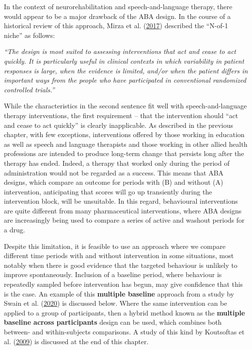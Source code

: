 \documentclass{krantz}
\begin{document}
In the context of neurorehabilitation and speech-and-language therapy, there would appear to be a major drawback of the ABA design. In the course of a historical review of this approach, Mirza et al. (\protect\hyperlink{ref-mirza2017}{2017}) described the ``N-of-1 niche'' as follows:

\emph{``The design is most suited to assessing interventions that act and cease to act quickly. It is particularly useful in clinical contexts in which variability in patient responses is large, when the evidence is limited, and/or when the patient differs in important ways from the people who have participated in conventional randomized controlled trials.''}

While the characteristics in the second sentence fit well with speech-and-language therapy interventions, the first requirement -- that the intervention should ``act and cease to act quickly'' is clearly inapplicable. As described in the previous chapter, with few exceptions, interventions offered by those working in education as well as speech and language therapists and those working in other allied health professions are intended to produce long-term change that persists long after the therapy has ended. Indeed, a therapy that worked only during the period of administration would not be regarded as a success. This means that ABA designs, which compare an outcome for periods with (B) and without (A) intervention, anticipating that scores will go up transiently during the intervention block, will be unsuitable. In this regard, behavioural interventions are quite different from many pharmaceutical interventions, where ABA designs are increasingly being used to compare a series of active and washout periods for a drug.

Despite this limitation, it is feasible to use an approach where we compare different time periods with and without intervention in some situations, most notably when there is good evidence that the targeted behaviour is unlikely to improve spontaneously. Inclusion of a baseline period, where behaviour is repeatedly sampled before intervention has begun, may give confidence that this is the case. An example of this \textbf{multiple baseline} approach from a study by Swain et al. (\protect\hyperlink{ref-swain2020}{2020}) is discussed below. Where the same intervention can be applied to a group of participants, then a hybrid method known as the \textbf{multiple baseline across participants} design can be used, which combines both between- and within-subjects comparisons. A study of this kind by Koutsoftas et al. (\protect\hyperlink{ref-koutsoftas2009}{2009}) is discussed at the end of this chapter.
\end{document}
